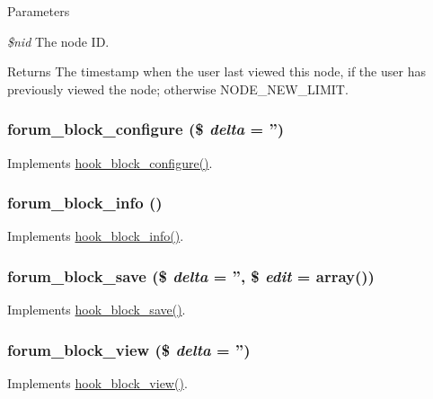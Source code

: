 \begin{DoxyParams}{Parameters}
\item[{\em \$nid}]The node ID.\end{DoxyParams}
\begin{DoxyReturn}{Returns}
The timestamp when the user last viewed this node, if the user has previously viewed the node; otherwise NODE\_\-NEW\_\-LIMIT. 
\end{DoxyReturn}
\hypertarget{forum_8module_a4b4c684609a29d037480504be38c3ab6}{
\subsubsection[{forum\_\-block\_\-configure}]{\setlength{\rightskip}{0pt plus 5cm}forum\_\-block\_\-configure (\$ {\em delta} = {\ttfamily ''})}}
\label{forum_8module_a4b4c684609a29d037480504be38c3ab6}
Implements \hyperlink{group__hooks_gacc86fefd1e0299f387f79a37dd1a48b7}{hook\_\-block\_\-configure()}. \hypertarget{forum_8module_a33c02440dca314b244864b9b4f0a3a37}{
\subsubsection[{forum\_\-block\_\-info}]{\setlength{\rightskip}{0pt plus 5cm}forum\_\-block\_\-info ()}}
\label{forum_8module_a33c02440dca314b244864b9b4f0a3a37}
Implements \hyperlink{group__hooks_ga2bd926c3e90deeba0c3ba64fb3c64d73}{hook\_\-block\_\-info()}. \hypertarget{forum_8module_a5b34b26f6b5fdba97924e6533310445c}{
\subsubsection[{forum\_\-block\_\-save}]{\setlength{\rightskip}{0pt plus 5cm}forum\_\-block\_\-save (\$ {\em delta} = {\ttfamily ''}, \/  \$ {\em edit} = {\ttfamily array()})}}
\label{forum_8module_a5b34b26f6b5fdba97924e6533310445c}
Implements \hyperlink{group__hooks_ga622024ce4f818c241ca7a765e829f928}{hook\_\-block\_\-save()}. \hypertarget{forum_8module_ab6b1e6be188dacf620ab5ece0861a2ac}{
\subsubsection[{forum\_\-block\_\-view}]{\setlength{\rightskip}{0pt plus 5cm}forum\_\-block\_\-view (\$ {\em delta} = {\ttfamily ''})}}
\label{forum_8module_ab6b1e6be188dacf620ab5ece0861a2ac}
Implements \hyperlink{group__hooks_gaa14092a3e74cdc57aa295100cfd6860d}{hook\_\-block\_\-view()}.

